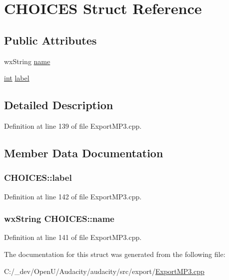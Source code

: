 \hypertarget{struct_c_h_o_i_c_e_s}{}\section{C\+H\+O\+I\+C\+ES Struct Reference}
\label{struct_c_h_o_i_c_e_s}
\subsection*{Public Attributes}
\begin{DoxyCompactItemize}
\item 
wx\+String \hyperlink{struct_c_h_o_i_c_e_s_a0d606b7f81969733e3a91b3ee405d251}{name}
\item 
\hyperlink{xmltok_8h_a5a0d4a5641ce434f1d23533f2b2e6653}{int} \hyperlink{struct_c_h_o_i_c_e_s_a42ee9f227ae6f5028307ddba6d98ea60}{label}
\end{DoxyCompactItemize}


\subsection{Detailed Description}


Definition at line 139 of file Export\+M\+P3.\+cpp.



\subsection{Member Data Documentation}
\subsubsection[{\texorpdfstring{label}{label}}]{ C\+H\+O\+I\+C\+E\+S\+::label}\hypertarget{struct_c_h_o_i_c_e_s_a42ee9f227ae6f5028307ddba6d98ea60}{}\label{struct_c_h_o_i_c_e_s_a42ee9f227ae6f5028307ddba6d98ea60}


Definition at line 142 of file Export\+M\+P3.\+cpp.

\subsubsection[{\texorpdfstring{name}{name}}]{\setlength{\rightskip}{0pt plus 5cm}wx\+String C\+H\+O\+I\+C\+E\+S\+::name}\hypertarget{struct_c_h_o_i_c_e_s_a0d606b7f81969733e3a91b3ee405d251}{}\label{struct_c_h_o_i_c_e_s_a0d606b7f81969733e3a91b3ee405d251}


Definition at line 141 of file Export\+M\+P3.\+cpp.



The documentation for this struct was generated from the following file\+:\begin{DoxyCompactItemize}
\item 
C\+:/\+\_\+dev/\+Open\+U/\+Audacity/audacity/src/export/\hyperlink{_export_m_p3_8cpp}{Export\+M\+P3.\+cpp}\end{DoxyCompactItemize}
